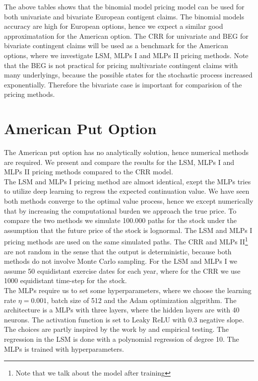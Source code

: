 The above tables shows that the binomial model pricing model can be used for both univariate and bivariate European contigent claims. The binomial models accuracy are high for European options, hence we expect a similar good approximatation for the American option. The CRR for univariate and BEG for bivariate contingent claims will be used as a benchmark for the American options, where we investigate LSM, MLPs I and MLPs II pricing methods. Note that the BEG is not practical for pricing multivariate contingent claims with many underlyings, because the possible states for the stochastic process increased exponentially. Therefore the bivariate case is important for comparision of the pricing methods.

\section{American Put Option}
The American put option has no analytically solution, hence numerical methods are required. We present and compare the results for the LSM, MLPs I and MLPs II pricing methods compared to the CRR model.\\

The LSM and MLPs I pricing method are almost identical, exept the MLPs tries to utilize deep learning to regress the expected continuation value. We have seen both methods converge to the optimal value process, hence we except numerically that by increasing the computational burden we approach the true price. To compare the two methods we simulate 100.000 paths for the stock under the assumption that the future price of the stock is lognormal. The LSM and MLPs I pricing methods are used on the same simulated paths. The CRR and MLPs II\footnote{Note that we talk about the model after training} are not random in the sense that the output is deterministic, because both methods do not involve Monte Carlo sampling. For the LSM and MLPs I we assume 50 equidistant exercise dates for each year, where for the CRR we use 1000 equidistant time-step for the stock.  \\

The MLPs require us to set some hyperparameters, where we choose the learning rate $\eta=0.001$, batch size of 512 and the Adam optimization algprithm. The architecture is a MLPs with three layers, where the hidden layers are with 40 neurons. The activation function is set to Leaky ReLU with 0.3 negative slope. The choices are partly inspired by the work by \parencite{Lelong19} and empirical testing. The regression in the LSM is done with a polynomial regression of degree 10. The MLPs is trained with hyperparameters.\\

